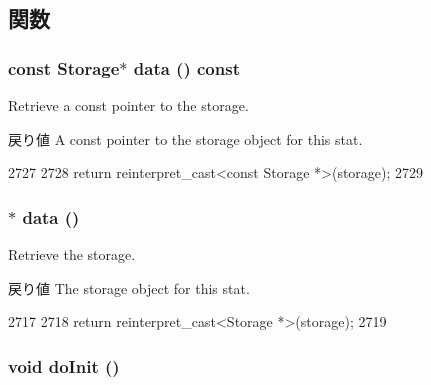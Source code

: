 \subsection{関数}
\hypertarget{classStats_1_1SparseHistBase_aabedc9303ac5bae8af18ceaeeb7fe44b}{
\subsubsection[{data}]{\setlength{\rightskip}{0pt plus 5cm}const {\bf Storage}$\ast$ data () const}}
\label{classStats_1_1SparseHistBase_aabedc9303ac5bae8af18ceaeeb7fe44b}
Retrieve a const pointer to the storage. \begin{DoxyReturn}{戻り値}
A const pointer to the storage object for this stat. 
\end{DoxyReturn}



\begin{DoxyCode}
2727     {
2728         return reinterpret_cast<const Storage *>(storage);
2729     }
\end{DoxyCode}
\hypertarget{classStats_1_1SparseHistBase_a6616795ceb2f25c33a3c2d6c0a387514}{
\subsubsection[{data}]{$\ast$ data ()}}
\label{classStats_1_1SparseHistBase_a6616795ceb2f25c33a3c2d6c0a387514}
Retrieve the storage. \begin{DoxyReturn}{戻り値}
The storage object for this stat. 
\end{DoxyReturn}



\begin{DoxyCode}
2717     {
2718         return reinterpret_cast<Storage *>(storage);
2719     }
\end{DoxyCode}
\hypertarget{classStats_1_1SparseHistBase_acbb3b2ff6c84b7ae0dcc576f85bee3b5}{
\subsubsection[{doInit}]{\setlength{\rightskip}{0pt plus 5cm}void doInit ()}}
\label{classStats_1_1SparseHistBase_acbb3b2ff6c84b7ae0dcc576f85bee3b5}



